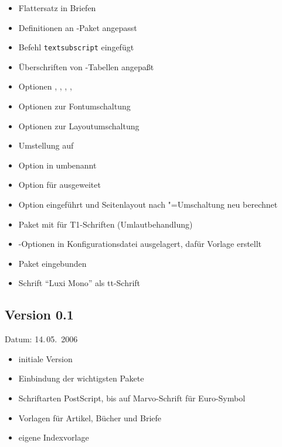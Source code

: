 \begin{itemize}
	\item Flattersatz in Briefen
	\item Definitionen an -Paket angepasst
	\item Befehl \texttt{textsubscript} eingefügt
	\item Überschriften von -Tabellen angepaßt
	\item Optionen , , , , 
	\item Optionen  zur Fontumschaltung
	\item Optionen  zur Layoutumschaltung
	\item Umstellung auf 
	\item Option  in  umbenannt
	\item Option  für  ausgeweitet
	\item Option  eingeführt und Seitenlayout nach "=Umschaltung neu berechnet
	\item Paket  mit  für T1-Schriften (Umlautbehandlung)
	\item {}-Optionen in Konfigurationsdatei ausgelagert, dafür Vorlage erstellt
	\item Paket  eingebunden
	\item Schrift "`Luxi Mono"' als tt-Schrift
\end{itemize}

\subsection{Version 0.1}

Datum: 14.\,05.~2006

\begin{itemize}
	\item initiale Version
	\item Einbindung der wichtigsten Pakete
	\item Schriftarten PostScript, bis auf Marvo-Schrift für Euro-Symbol
	\item Vorlagen für Artikel, Bücher und Briefe
	\item eigene Indexvorlage
\end{itemize}


